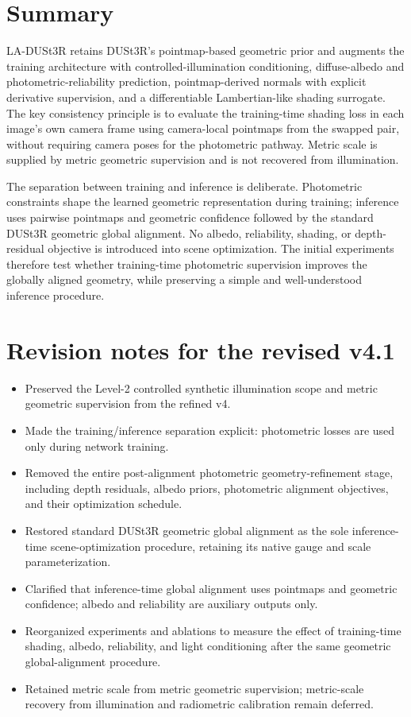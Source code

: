 \documentclass[11pt,a4paper]{article}
\begin{document}
\section{Summary}

LA-DUSt3R retains DUSt3R's pointmap-based geometric prior and augments the
training architecture with controlled-illumination conditioning,
diffuse-albedo and photometric-reliability prediction, pointmap-derived
normals with explicit derivative supervision, and a differentiable
Lambertian-like shading surrogate. The key consistency principle is to
evaluate the training-time shading loss in each image's own camera frame
using camera-local pointmaps from the swapped pair, without requiring camera
poses for the photometric pathway. Metric scale is supplied by metric
geometric supervision and is not recovered from illumination.

The separation between training and inference is deliberate. Photometric
constraints shape the learned geometric representation during training;
inference uses pairwise pointmaps and geometric confidence followed by the
standard DUSt3R geometric global alignment. No albedo, reliability, shading,
or depth-residual objective is introduced into scene optimization. The
initial experiments therefore test whether training-time photometric
supervision improves the globally aligned geometry, while preserving a
simple and well-understood inference procedure.

\appendix

\section{Revision notes for the revised v4.1}

\begin{itemize}
  \item Preserved the Level-2 controlled synthetic illumination scope and
  metric geometric supervision from the refined v4.
  \item Made the training/inference separation explicit: photometric losses
  are used only during network training.
  \item Removed the entire post-alignment photometric geometry-refinement
  stage, including depth residuals, albedo priors, photometric alignment
  objectives, and their optimization schedule.
  \item Restored standard DUSt3R geometric global alignment as the sole
  inference-time scene-optimization procedure, retaining its native gauge
  and scale parameterization.
  \item Clarified that inference-time global alignment uses pointmaps and
  geometric confidence; albedo and reliability are auxiliary outputs only.
  \item Reorganized experiments and ablations to measure the effect of
  training-time shading, albedo, reliability, and light conditioning after
  the same geometric global-alignment procedure.
  \item Retained metric scale from metric geometric supervision; metric-scale
  recovery from illumination and radiometric calibration remain deferred.
\end{itemize}
\end{document}
